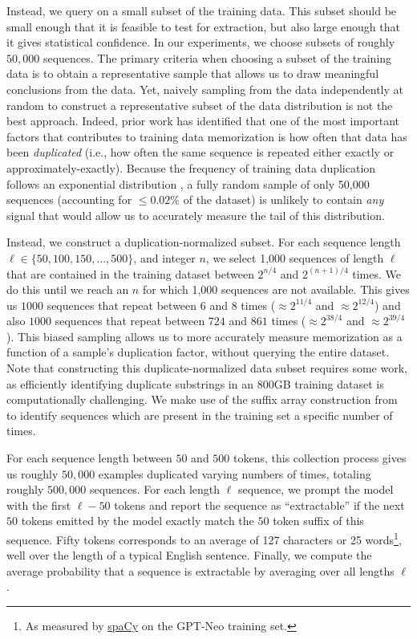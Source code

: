 Instead, we query on a small subset of the training data.
%
This subset should be small enough that it is feasible to test for extraction, 
but also large enough that
it gives statistical confidence.
%
In our experiments, we choose subsets of roughly $50{,}000$ sequences.
The primary criteria when choosing a subset of the training data is to obtain a representative sample that allows
us to draw meaningful conclusions from the data.
%
Yet, naively sampling from the data independently at random to construct a representative subset of the data distribution is not the best approach.
Indeed, prior work has identified that one of the most important factors that contributes to training data memorization is how often that data has been \emph{duplicated} (i.e., how often the same sequence is repeated either exactly or approximately-exactly).
%
Because the frequency of training data duplication follows an exponential distribution \citep{lee2021deduplicating}, a fully random sample of only 50,000 sequences
(accounting for $\le 0.02\%$ of the dataset)
is unlikely to contain \emph{any} signal that would allow us to 
accurately measure the tail of this distribution.




Instead, we construct a duplication-normalized subset.
%
For each sequence length $\ell \in \{50,100,150,\dots,500\}$,
and integer $n$,
we select 1,000 sequences of length $\ell$ that are contained in the training dataset between $2^{n/4}$ and $2^{(n+1)/4}$ times.
We do this until we reach an $n$ for which 1,000 sequences are not available.
%
This gives us $1000$ sequences that repeat between $6$ and $8$ times ($\approx 2^{11/4}$ and $\approx 2^{12/4}$) and also $1000$ sequences that repeat between $724$ and $861$ times ($\approx 2^{38/4}$ and $\approx 2^{39/4}$).
%
This biased sampling allows us to more accurately measure memorization as a function of a sample's duplication factor, without querying the entire dataset.
%
Note that constructing this duplicate-normalized data subset requires some work,
as efficiently identifying duplicate substrings in an $800$GB training dataset is
computationally challenging.
%
We make use of the suffix array construction from \citet{lee2021deduplicating} to identify sequences which are present in the training set a specific number of times.

For each sequence length between $50$ and $500$ tokens, this collection process gives us roughly $50,000$ examples duplicated varying numbers
of times,
totaling roughly $500{,}000$ sequences.
%
For each length $\ell$ sequence, we prompt the model with the first $\ell-50$ tokens and report the sequence
as ``extractable'' if the next $50$ tokens emitted by the model exactly match the $50$ token suffix of this sequence.
Fifty tokens corresponds to an average of 127 characters or 25 words\footnote{As measured by \href{https://spacy.io/}{spaCy} on the GPT-Neo training set.}, well over the length of a typical English sentence.
%
Finally, we compute the average probability that a sequence is extractable by averaging over all lengths $\ell$.


